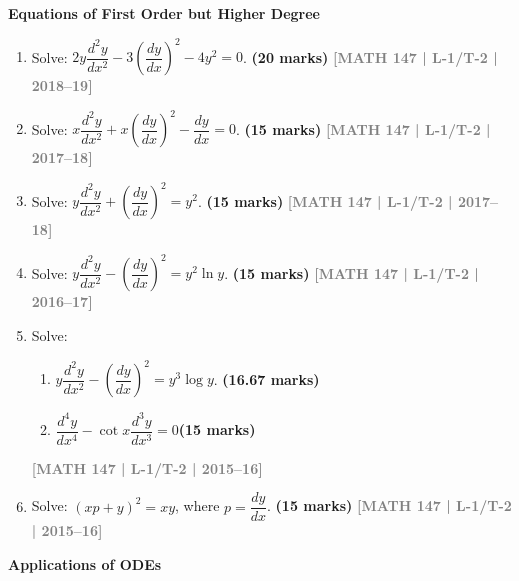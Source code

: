 \documentclass[12pt,a3paper]{article}
\newcommand{\yr}[1]{\hfill\textcolor{gray}{\small\textbf{[#1]}}}
\newcommand{\mk}[1]{\textcolor{orange!70!black}{\small\textbf{(#1 marks)}}}
\newcommand{\subtopic}[2]{%
  \vspace{10pt}
  \noindent\begin{tcolorbox}[colback=#1!8,colframe=#1,boxrule=0.6pt,arc=4pt,
    left=6pt,right=6pt,top=4pt,bottom=4pt]
    \small\bfseries\textcolor{#1}{#2}
  \end{tcolorbox}
  \vspace{2pt}
}
\begin{document}
\subtopic{cC}{Equations of First Order but Higher Degree}
\label{sub:s3-higherdeg}

\begin{enumerate}
  
\item Solve: $2y\dfrac{d^{2}y}{dx^{2}}-3\left(\dfrac{dy}{dx}\right)^{2}-4y^{2}=0$.
\mk{20} \yr{MATH 147 | L-1/T-2 | 2018--19}

\item Solve: $x\dfrac{d^{2}y}{dx^{2}}+x\left(\dfrac{dy}{dx}\right)^{2}-\dfrac{dy}{dx}=0$.
\mk{15} \yr{MATH 147 | L-1/T-2 | 2017--18}

\item Solve: $y\dfrac{d^{2}y}{dx^{2}}+\left(\dfrac{dy}{dx}\right)^{2}=y^{2}$.
\mk{15} \yr{MATH 147 | L-1/T-2 | 2017--18}

\item Solve: $y\dfrac{d^{2}y}{dx^{2}}-\left(\dfrac{dy}{dx}\right)^{2}=y^{2}\ln y$.
\mk{15} \yr{MATH 147 | L-1/T-2 | 2016--17}

\item Solve:
\begin{enumerate}
\item $y\dfrac{d^{2}y}{dx^{2}}-\left(\dfrac{dy}{dx}\right)^{2}=y^{3}\log y$. \mk{16.67}
\item $\dfrac{d^{4}y}{dx^{4}}-\cot{x}\dfrac{d^{3}y}{dx^{3}}=0$\mk{15} 
\end{enumerate}  
\yr{MATH 147 | L-1/T-2 | 2015--16}
\item Solve: $(xp+y)^{2}=xy$, where $p=\dfrac{dy}{dx}$.
\mk{15} \yr{MATH 147 | L-1/T-2 | 2015--16}

\end{enumerate}


\subtopic{cC}{Applications of ODEs}
\label{sub:s3-applications}
\end{document}
